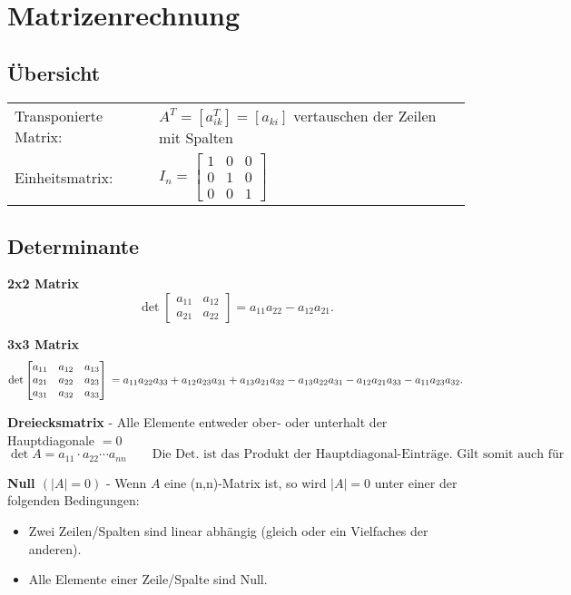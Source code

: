 \section{Matrizenrechnung}
\subsection{Übersicht}
	\begin{tabular}{l l}
    	Transponierte Matrix: & $A^T=[a_{ik}^T]=[a_{ki}]$ vertauschen der Zeilen
    	mit Spalten\\
    	Einheitsmatrix:& $I_n= 
			    	\begin{bmatrix} 
			        	1&0 & 0\\
			        	0&1&0\\
			        	0&0&1                               
			        \end{bmatrix}
$		    
    \end{tabular}

\subsection{Determinante}

	\textbf{2x2 Matrix}    
	$$ \det \begin{bmatrix} a_{11} & a_{12} \\ a_{21} & a_{22} \end{bmatrix} =
	a_{11} a_{22} - a_{12} a_{21}.  $$
	
	\textbf{3x3 Matrix}
	$$ \det \begin{bmatrix} a_{11} & a_{12} & a_{13} \\ a_{21} & a_{22}& a_{23} \\
	a_{31} & a_{32} & a_{33} \end{bmatrix} \\ = a_{11} a_{22} a_{33} + a_{12}
	a_{23} a_{31} + a_{13} a_{21} a_{32} - a_{13} a_{22} a_{31} - a_{12} a_{21}
	a_{33} - a_{11} a_{23} a_{32}.  $$
	
	\textbf{Dreiecksmatrix} - Alle Elemente entweder ober- oder unterhalt der Hauptdiagonale $= 0$
	$$\det A =a_{11}\cdot a_{22}\dotsb a_{nn} \quad  \quad \text{Die Det. ist das Produkt
	der Hauptdiagonal-Einträge. Gilt somit auch für Diagonalmatritzen.} $$
	
	\textbf{Null $(|A| = 0)$} - Wenn $A$ eine (n,n)-Matrix ist, so wird $|A| = 0$ unter einer der
	folgenden Bedingungen:
	\begin{itemize}
    	\item Zwei Zeilen/Spalten sind linear abhängig (gleich oder ein Vielfaches der anderen).
    	\item Alle Elemente einer Zeile/Spalte sind Null. \\
  	\end{itemize} 
	
